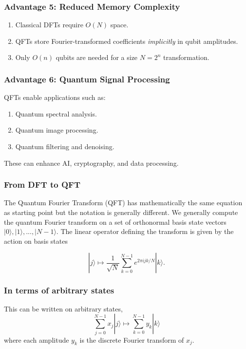 \documentclass{beamer}
\begin{document}
\begin{frame}
\frametitle{Advantage 5: Reduced Memory Complexity}

\begin{enumerate}
\item Classical DFTs require $O(N)$ space.

\item QFTs store Fourier-transformed coefficients \emph{implicitly} in qubit amplitudes.

\item Only $O(n)$ qubits are needed for a size $N = 2^n$ transformation.
\end{enumerate}

\noindent
\end{frame}

\begin{frame}
\frametitle{Advantage 6: Quantum Signal Processing}

QFTs enable applications such as:
\begin{enumerate}
\item Quantum spectral analysis.

\item Quantum image processing.

\item Quantum filtering and denoising.
\end{enumerate}

\noindent
These can enhance AI, cryptography, and data processing.
\end{frame}

\begin{frame}
\frametitle{From DFT to QFT}

The Quantum Fourier Transform (QFT) has mathematically the same equation as starting point
but the notation is generally different. We generally compute the
quantum Fourier transform on a set of orthonormal basis state vectors
\(|0\rangle, |1\rangle, ..., |N-1\rangle\). The linear operator defining
the transform is given by the action on basis states

\[
|j\rangle \mapsto \frac{1}{\sqrt{N}} \sum_{k=0}^{N-1} e^{2\pi ijk/N}|k\rangle.
\]
\end{frame}

\begin{frame}
\frametitle{In terms of arbitrary states}

This can be written on arbitrary states,
\[
\sum_{j=0}^{N-1}x_j|j\rangle \mapsto \sum_{k=0}^{N-1} y_k|k\rangle
\]
where each amplitude \(y_k\) is the discrete Fourier transform of
\(x_j\).
\end{frame}
\end{document}
